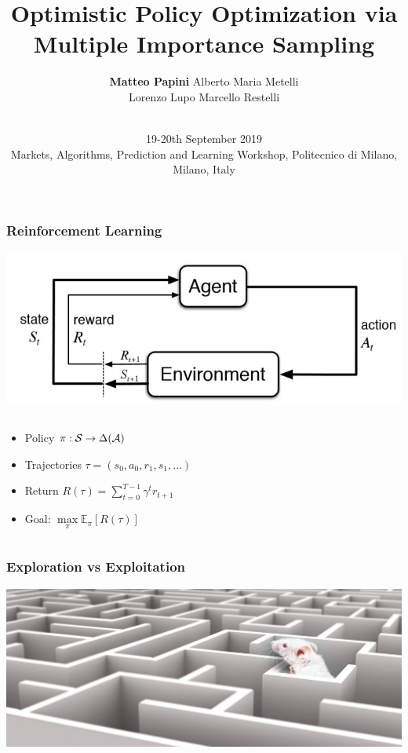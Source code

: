 \documentclass[aspectratio=169, table]{beamer}
\title{Optimistic Policy Optimization via Multiple Importance Sampling}
\date[AAA]{\vspace{0.2cm} \\ \small{ 19-20th September 2019 \\ Markets, Algorithms, Prediction and Learning Workshop, Politecnico di Milano, Milano, Italy}}
\author[M. Papini]{\textbf{Matteo Papini} \quad Alberto Maria Metelli\\
						{Lorenzo Lupo \quad Marcello Restelli}}
\begin{document}

\begin{frame}[noframenumbering]
\titlepage
\end{frame}

\begin{frame}
\frametitle{Reinforcement Learning} 
\begin{center}
	\includegraphics[width=.6\linewidth]{rl.jpg}
\end{center}
\begin{columns}
	\begin{column}{.7\textwidth}
		\begin{itemize}
			\item Policy $\pi:\mathcal{S}\to\Delta(\mathcal{A})$
			\item Trajectories $\tau = (s_0, a_0, r_1, s_1,\dots)$
			\item Return $R(\tau) = \sum_{t=0}^{T-1}\gamma^t r_{t+1}$
			\item Goal: $\max\limits_{\pi} \mathbb{E}_{\pi}\left[R(\tau)\right]$
		\end{itemize}
	\end{column}
	\begin{column}{.3\textwidth}
\end{column}
\end{columns}
\end{frame}

\begin{frame}
\frametitle{Exploration vs Exploitation}
\centering
\includegraphics[width=\textwidth]{mouse.jpg}
\end{frame}
\end{document}
